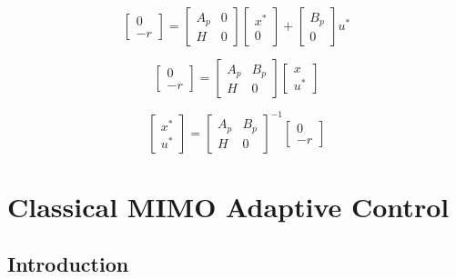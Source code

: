 \begin{equation*}
  \begin{bmatrix}
    0 \\
    -r
  \end{bmatrix}=
  \begin{bmatrix}
    A_{p} & 0 \\
    H & 0
  \end{bmatrix}
  \begin{bmatrix}
    x^{*} \\
    0
  \end{bmatrix}+
  \begin{bmatrix}
    B_{p} \\
    0
  \end{bmatrix}u^{*}
\end{equation*}

\begin{equation*}
  \begin{bmatrix}
    0 \\
    -r
  \end{bmatrix}=
  \begin{bmatrix}
    A_{p} & B_{p} \\
    H & 0
  \end{bmatrix}
  \begin{bmatrix}
    x \\
    u^{*}
  \end{bmatrix}
\end{equation*}

\begin{equation*}
  \begin{bmatrix}
    x^{*} \\
    u^{*}
  \end{bmatrix}=
  \begin{bmatrix}
    A_{p} & B_{p} \\
    H & 0
  \end{bmatrix}^{-1}
  \begin{bmatrix}
    0 \\
    -r
  \end{bmatrix}
\end{equation*}

\chapter{Classical MIMO Adaptive Control}

\section{Introduction}

